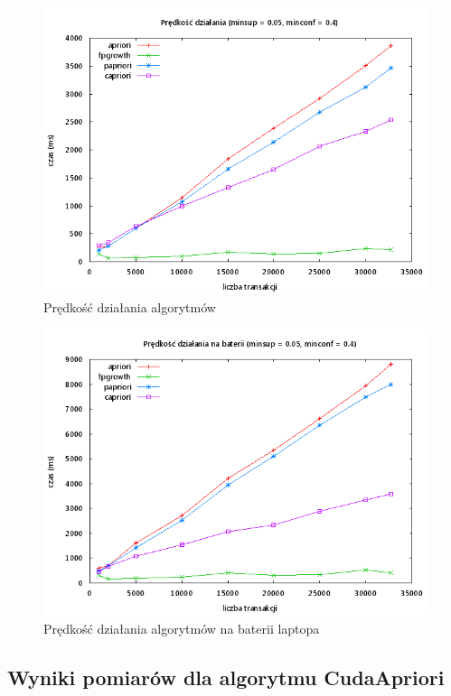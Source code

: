 \begin{figure}[ht]
\centering
\includegraphics[width=1.1\textwidth]{figures/06/005_04.png}
\caption{Prędkość działania algorytmów}
\end{figure}

\begin{figure}[ht]
\centering
\includegraphics[width=1.1\textwidth]{figures/06/005_04_bat.png}
\caption{Prędkość działania algorytmów na baterii laptopa}
\end{figure}

\subsection{Wyniki pomiarów dla algorytmu CudaApriori}


